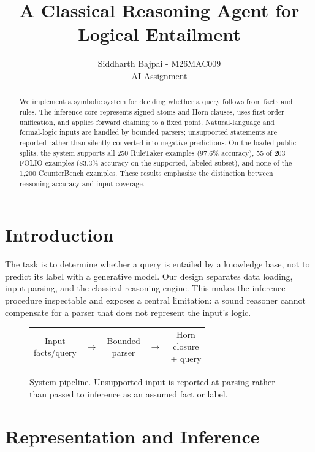 \documentclass[10pt,twocolumn,letterpaper]{article}
\title{A Classical Reasoning Agent for Logical Entailment}
\author{Siddharth Bajpai - M26MAC009\\AI Assignment}
\date{}
\begin{document}
\maketitle

\begin{abstract}
We implement a symbolic system for deciding whether a query follows from facts and rules. The inference core represents signed atoms and Horn clauses, uses first-order unification, and applies forward chaining to a fixed point. Natural-language and formal-logic inputs are handled by bounded parsers; unsupported statements are reported rather than silently converted into negative predictions. On the loaded public splits, the system supports all 250 RuleTaker examples (97.6\% accuracy), 55 of 203 FOLIO examples (83.3\% accuracy on the supported, labeled subset), and none of the 1,200 CounterBench examples. These results emphasize the distinction between reasoning accuracy and input coverage.
\end{abstract}

\section{Introduction}
The task is to determine whether a query is entailed by a knowledge base, not to predict its label with a generative model. Our design separates data loading, input parsing, and the classical reasoning engine. This makes the inference procedure inspectable and exposes a central limitation: a sound reasoner cannot compensate for a parser that does not represent the input's logic.

\begin{figure}[t]
\centering
\small
\setlength{\tabcolsep}{2pt}
\begin{tabular}{c c c c c}
\fbox{\parbox[c][0.9cm][c]{0.22\columnwidth}{\centering Input\\facts/query}} &
$\longrightarrow$ &
\fbox{\parbox[c][0.9cm][c]{0.22\columnwidth}{\centering Bounded\\parser}} &
$\longrightarrow$ &
\fbox{\parbox[c][0.9cm][c]{0.22\columnwidth}{\centering Horn\\closure\\+ query}}
\end{tabular}
\caption{System pipeline. Unsupported input is reported at parsing rather than passed to inference as an assumed fact or label.}
\label{fig:pipeline}
\end{figure}

\section{Representation and Inference}
\end{document}
